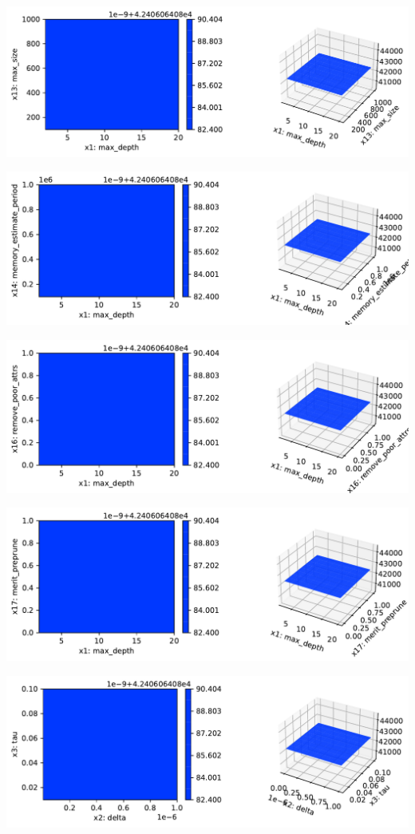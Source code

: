 \documentclass[
  letterpaper,
  DIV=11,
  numbers=noendperiod]{scrreprt}
\begin{document}
\includegraphics{024_spot_hpt_river_friedman_hatr_files/figure-pdf/cell-42-output-25.pdf}

\includegraphics{024_spot_hpt_river_friedman_hatr_files/figure-pdf/cell-42-output-26.pdf}

\includegraphics{024_spot_hpt_river_friedman_hatr_files/figure-pdf/cell-42-output-27.pdf}

\includegraphics{024_spot_hpt_river_friedman_hatr_files/figure-pdf/cell-42-output-28.pdf}

\includegraphics{024_spot_hpt_river_friedman_hatr_files/figure-pdf/cell-42-output-29.pdf}
\end{document}
